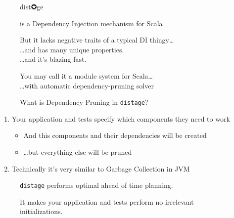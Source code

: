 \documentclass[usenames,dvipsnames,aspectratio=169]{beamer}
\newcommand{\distage}{\texttt{distage}\xspace}
\begin{document}
\begin{frame}
  \begin{figure}
  \Huge \color{RubineRed} dist✪ge
  \end{figure}

  \begin{figure}
  \LARGE is a Dependency Injection mechanism for Scala
  \end{figure}

  \begin{figure}
  \large But it lacks negative traits of a typical DI thingy\dots \\
  \Large \dots and has many unique properties. \\
  \dots and it's blazing fast.
  \end{figure}

  \begin{figure}
  \large You may call it a module system for Scala\dots \\
  \Large \dots with automatic dependency-pruning solver
  \end{figure}
\end{frame}

\begin{frame}
  \begin{figure}
  \Huge What is Dependency Pruning in \distage?
  \end{figure}

  \begin{enumerate}
  \item Your application and tests specify which components they need to work 
  \begin{itemize}
    \item And this components and their dependencies will be created
    \item \dots but everything else will be pruned
  \end{itemize}
  \item Technically it's very similar to Garbage Collection in JVM
  \end{enumerate} 
\end{frame}

\begin{frame}
  \begin{figure}
    \huge \distage performs optimal ahead of time planning.
  \end{figure}

    \begin{figure}
    \Large It makes your application and tests perform no irrelevant initializations.
  \end{figure}
\end{frame}
\end{document}
